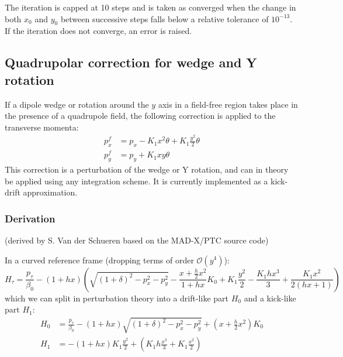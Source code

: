 The iteration is capped at 10 steps and is taken as converged when the change in both $x_0$ and
$y_0$ between successive steps falls below a relative tolerance of $10^{-13}$. If the iteration
does not converge, an error is raised.

\subsection{Quadrupolar correction for wedge and Y rotation}

If a dipole wedge or rotation around the $y$ axis in a field-free region
takes place in the presence of a quadrupole field,
the following correction is applied to the transverse momenta:
\begin{align}
p_x^f &= p_x - K_1 x^2 \theta + K_1 \frac{y^2}{2} \theta
\label{eq:pxf}
\\
p_y^f &= p_y + K_1 x y \theta
\label{eq:pyf}
\end{align}
This correction is a perturbation of the wedge or Y rotation, and can in theory be applied using any integration scheme. It is currently implemented as a kick-drift approximation.

\subsubsection*{Derivation}
(derived by S. Van der Schueren based on the MAD-X/PTC \cite{madsite} source code)

In a curved reference frame (dropping terms of order $\mathcal{O}(y^4)$):
\begin{equation}
H_\tau = \frac{p_\tau}{\beta_0} - (1 + h x)
\left(
\sqrt{(1+\delta)^2 - p_x^2 - p_y^2}
- \frac{x + \frac{h}{2} x^2}{1 + h x} K_0 + K_1 \frac{y^2}{2} - \frac{K_1 h x^3}{3} + \frac{K_1 x^2}{2(hx+1)}
\right)
\label{eq:Htau}
\end{equation}
which we can split in perturbation theory into a drift-like part $H_0$ and a kick-like part $H_1$:
\begin{align}
H_0 &= \frac{p_\tau}{\beta_0} - (1 + h x)\sqrt{(1+\delta)^2 - p_x^2 - p_y^2} + \left( x + \frac{h}{2}x^2 \right) K_0
\label{eq:H1}
\\
H_1 &= -(1 + h x) K_1 \frac{y^2}{2} + \left( K_1 h \frac{x^3}{3} + K_1 \frac{x^2}{2} \right)
\label{eq:H2}
\end{align}

